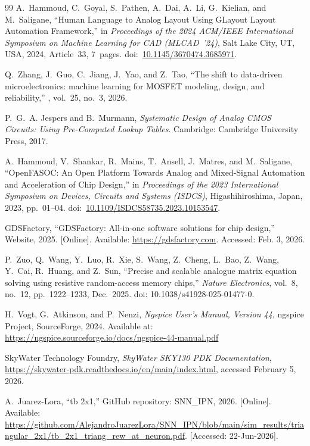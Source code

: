 \documentclass[letter, 12pt]{article}
\begin{document}
\begin{thebibliography}{99}
A.~Hammoud, C.~Goyal, S.~Pathen, A.~Dai, A.~Li, G.~Kielian, and M.~Saligane,
``Human Language to Analog Layout Using GLayout Layout Automation Framework,''
in \emph{Proceedings of the 2024 ACM/IEEE International Symposium on Machine Learning for CAD (MLCAD~'24)},
Salt Lake City, UT, USA, 2024, Article~33, 7~pages.
doi:~\href{https://doi.org/10.1145/3670474.3685971}{10.1145/3670474.3685971}.


Q.~Zhang, J.~Guo, C.~Jiang, J.~Yao, and Z.~Tao,
\newblock ``The shift to data-driven microelectronics: machine learning for MOSFET modeling, design, and reliability,''
, vol.~25, no.~3, 2026.

P.~G.~A. Jespers and B.~Murmann, \emph{Systematic Design of Analog CMOS Circuits: Using Pre-Computed Lookup Tables}.
\newblock Cambridge: Cambridge University Press, 2017.

A.~Hammoud, V.~Shankar, R.~Mains, T.~Ansell, J.~Matres, and M.~Saligane,
``OpenFASOC: An Open Platform Towards Analog and Mixed-Signal Automation and Acceleration of Chip Design,''
in \emph{Proceedings of the 2023 International Symposium on Devices, Circuits and Systems (ISDCS)},
Higashihiroshima, Japan, 2023, pp.~01--04.
doi:~\href{https://doi.org/10.1109/ISDCS58735.2023.10153547}{10.1109/ISDCS58735.2023.10153547}.

GDSFactory, ``GDSFactory: All-in-one software solutions for chip design,'' Website, 2025. [Online]. Available: \url{https://gdsfactory.com}. Accessed: Feb. 3, 2026.

P.~Zuo, Q.~Wang, Y.~Luo, R.~Xie, S.~Wang, Z.~Cheng, L.~Bao, Z.~Wang, Y.~Cai, R.~Huang, and Z.~Sun,  
“Precise and scalable analogue matrix equation solving using resistive random-access memory chips,”  
\emph{Nature Electronics}, vol.~8, no.~12, pp.~1222--1233, Dec.~2025.  
doi: 10.1038/s41928-025-01477-0.

H.~Vogt, G.~Atkinson, and P.~Nenzi,
\emph{Ngspice User's Manual, Version 44},
ngspice Project, SourceForge, 2024.
Available at:
\url{https://ngspice.sourceforge.io/docs/ngspice-44-manual.pdf}

SkyWater Technology Foundry,
\textit{SkyWater SKY130 PDK Documentation},
\url{https://skywater-pdk.readthedocs.io/en/main/index.html},
accessed February 5, 2026.


A.~Juarez-Lora, ``tb 2x1,'' GitHub repository: SNN\_IPN, 2026. [Online]. Available: \url{https://github.com/AlejandroJuarezLora/SNN_IPN/blob/main/sim_results/triangular_2x1/tb_2x1_triang_rew_at_neuron.pdf}. [Accessed: 22-Jun-2026].


\end{thebibliography}
\end{document}
